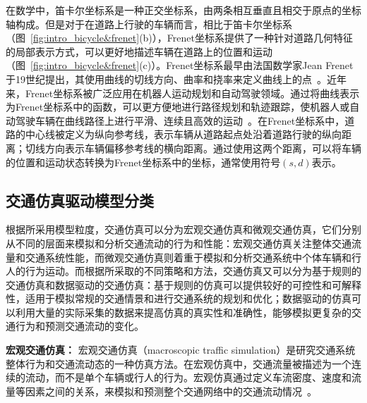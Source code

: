在数学中，笛卡尔坐标系是一种正交坐标系，由两条相互垂直且相交于原点的坐标轴构成。但是对于在道路上行驶的车辆而言，相比于笛卡尔坐标系（图~\ref{fig:intro_bicycle&frenet}(b)），Frenet坐标系提供了一种针对道路几何特征的局部表示方式，可以更好地描述车辆在道路上的位置和运动（图~\ref{fig:intro_bicycle&frenet}(c)）。Frenet坐标系最早由法国数学家Jean Frenet于19世纪提出，其使用曲线的切线方向、曲率和挠率来定义曲线上的点~\cite{serret1851quelques, frenet1852courbes}。近年来，Frenet坐标系被广泛应用在机器人运动规划和自动驾驶领域。通过将曲线表示为Frenet坐标系中的函数，可以更方便地进行路径规划和轨迹跟踪，使机器人或自动驾驶车辆在曲线路径上进行平滑、连续且高效的运动~\cite{werling2010optimal, yoshihara2017autonomous, zhu2020trajectory}。在Frenet坐标系中，道路的中心线被定义为纵向参考线，表示车辆从道路起点处沿着道路行驶的纵向距离；切线方向表示车辆偏移参考线的横向距离。通过使用这两个距离，可以将车辆的位置和运动状态转换为Frenet坐标系中的坐标，通常使用符号$(s, d)$表示。



\subsection{交通仿真驱动模型分类}

根据所采用模型粒度，交通仿真可以分为宏观交通仿真和微观交通仿真，它们分别从不同的层面来模拟和分析交通流动的行为和性能：宏观交通仿真关注整体交通流量和交通系统性能，而微观交通仿真则着重于模拟和分析交通系统中个体车辆和行人的行为运动。而根据所采取的不同策略和方法，交通仿真又可以分为基于规则的交通仿真和数据驱动的交通仿真：基于规则的仿真可以提供较好的可控性和可解释性，适用于模拟常规的交通情景和进行交通系统的规划和优化；数据驱动的仿真可以利用大量的实际采集的数据来提高仿真的真实性和准确性，能够模拟更复杂的交通行为和预测交通流动的变化。

\textbf{宏观交通仿真：} 宏观交通仿真（macroscopic traffic simulation）是研究交通系统整体行为和交通流动态的一种仿真方法。在宏观仿真中，交通流量被描述为一个连续的流动，而不是单个车辆或行人的行为。宏观仿真通过定义车流密度、速度和流量等因素之间的关系，来模拟和预测整个交通网络中的交通流动情况~\cite{wang2017survey, chao2020survey}。

